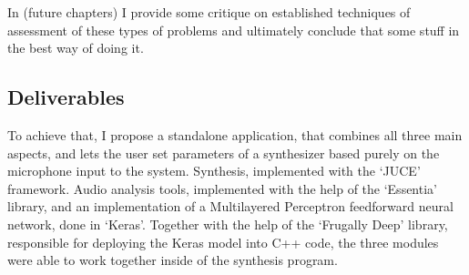 In (future chapters) I provide some critique on established techniques of
assessment of these types of problems and ultimately conclude that some stuff in
the best way of doing it.

\subsection{Deliverables}

To achieve that, I propose a standalone application, that combines all three
main aspects, and lets the user set parameters of a synthesizer based purely on
the microphone input to the system.  Synthesis, implemented with the `JUCE'
framework.  Audio analysis tools, implemented with the help of the `Essentia'
library, and an implementation of a Multilayered Perceptron feedforward neural
network, done in `Keras'. Together with the help of the `Frugally Deep' library,
responsible for deploying the Keras model into C++ code, the three modules were
able to work together inside of the synthesis program.


%
%
%
% 
%
%
%
%
%
%
%
%
